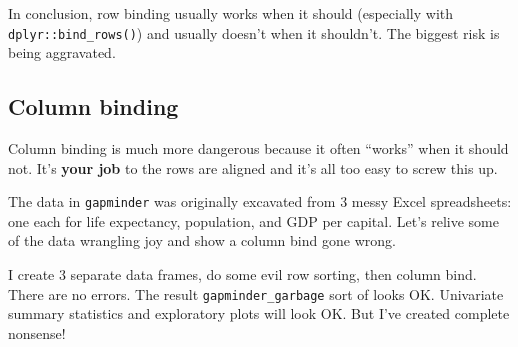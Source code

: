 \documentclass[
]{book}
\begin{document}
In conclusion, row binding usually works when it should (especially with \texttt{dplyr::bind\_rows()}) and usually doesn't when it shouldn't. The biggest risk is being aggravated.

\hypertarget{column-binding}{%
\subsection{Column binding}\label{column-binding}}

Column binding is much more dangerous because it often ``works'' when it should not. It's \textbf{your job} to the rows are aligned and it's all too easy to screw this up.

The data in \texttt{gapminder} was originally excavated from 3 messy Excel spreadsheets: one each for life expectancy, population, and GDP per capital. Let's relive some of the data wrangling joy and show a column bind gone wrong.

I create 3 separate data frames, do some evil row sorting, then column bind. There are no errors. The result \texttt{gapminder\_garbage} sort of looks OK. Univariate summary statistics and exploratory plots will look OK. But I've created complete nonsense!
\end{document}
